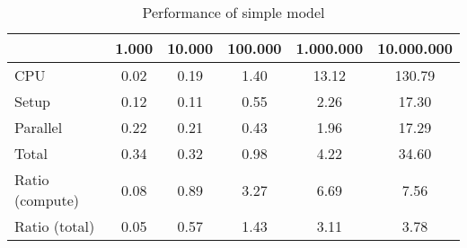 \begin{table}[!h]
\centering
\caption{Performance of simple model}
\begin{tabular}{l*{5}{c}}\hline
& 1.000 &          10.000 &         100.000 &       1.000.000 &      10.000.000 \\ \hline
CPU &     0.02 &      0.19 &      1.40 &     13.12 &    130.79 \\
Setup &     0.12 &      0.11 &      0.55 &      2.26 &     17.30 \\
Parallel &     0.22 &      0.21 &      0.43 &      1.96 &     17.29 \\
Total &     0.34 &      0.32 &      0.98 &      4.22 &     34.60 \\
Ratio (compute) &     0.08 &      0.89 &      3.27 &      6.69 &      7.56 \\
Ratio (total) &     0.05 &      0.57 &      1.43 &      3.11 &      3.78 \\
\hline
\end{tabular}
\end{table}
